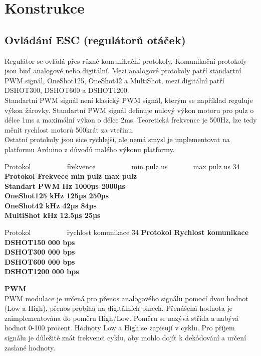 \chapter{Konstrukce}
\label{4-algoritmus}

\section{Ovládání ESC (regulátorů otáček)}
Regulátor se ovládá přes různé komunikační protokoly. Komunikační protokoly jsou buď analogové nebo digitální. Mezi analogové protokoly patří standartní PWM signál, OneShot125, OneShot42 a MultiShot, mezi digitální patří  DSHOT300, DSHOT600 a DSHOT1200.\\
Standartní PWM signál není klasický PWM signál, kterým se například reguluje výkon žárovky. Standartní PWM signál definuje nulový výkon motoru pro pulz o délce 1ms a maximální výkon o délce 2ms. Teoretická frekvence je 500Hz, lze tedy měnit rychlost motorů 500krát za vteřinu.\\
Ostatní protokoly jsou sice rychlejší, ale nemá smysl je implementovat na platformu Arduino z důvodů malého výkonu platformy.\\ 

\begin{tabbing}
	Protokol ~~~~~~~~~ \= frekvence ~~~~~~~~~ \= min pulz us ~~~~~~ \= max pulz us
	\= 34 \kill
	\bfseries Protokol \>
	\bfseries Frekvece   \>
	\bfseries min pulz  \>
	\bfseries max pulz \\
	Standart PWM Hz \> 1000µs  \> 2000µs  \\
	OneShot125 kHz \>  125µs \> 250µs   \\
	OneShot42 kHz \> 42µs \> 84µs \\
	MultiShot kHz \> 12.5µs \> 25µs \\
\end{tabbing}

\begin{tabbing}
	Protokol ~~~~~~~~~ \= rychlost komunikace
	\= 34 \kill
		\bfseries Protokol \>
	\bfseries Rychlost komunikace   \\
	DSHOT150 000 bps \\
	DSHOT300 000 bps \\
	DSHOT600 000 bps  \\
	DSHOT1200 000 bps \\
\end{tabbing}

\textbf{PWM}\\
PWM modulace je určená pro přenos analogového signálu pomocí dvou hodnot (Low a High), přenos probíhá na digitálních pinech. Přenášená hodnota je zaimplementována do poměru High/Low. Poměru se nazývá střída a nabývá hodnot 0-100 procent. Hodnoty Low a High se zapisují v cyklu. Pro příjem signálu je důležité znát frekvenci cyklu, aby mohlo dojít k dekódování a určení zaslané hodnoty.


